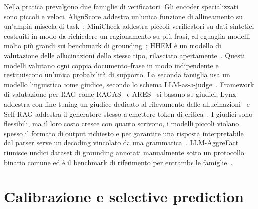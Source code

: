 Nella pratica prevalgono due famiglie di verificatori. Gli encoder specializzati sono piccoli e veloci. AlignScore addestra
un'unica funzione di allineamento su un'ampia miscela di task~\cite{zha2023alignscore}; MiniCheck addestra piccoli
verificatori su dati sintetici costruiti in modo da richiedere un ragionamento su più frasi, ed eguaglia modelli molto più
grandi sui benchmark di grounding~\cite{tang2024minicheck}; HHEM è un modello di valutazione delle allucinazioni dello
stesso tipo, rilasciato apertamente~\cite{vectara2024hhem}. Questi modelli valutano ogni coppia documento--frase in modo
indipendente e restituiscono un'unica probabilità di supporto. La seconda famiglia usa un modello linguistico come
giudice, secondo lo schema LLM-as-a-judge~\cite{zheng2023judging}. Framework di valutazione per RAG come
RAGAS~\cite{es2024ragas} e ARES~\cite{saadfalcon2024ares} si basano su giudici, Lynx addestra con fine-tuning un giudice
dedicato al rilevamento delle allucinazioni~\cite{ravi2024lynx} e Self-RAG addestra il generatore stesso a emettere token
di critica~\cite{asai2024selfrag}. I giudici sono flessibili, ma il loro costo cresce con quanto scrivono, i modelli
piccoli violano spesso il formato di output richiesto e per garantire una risposta interpretabile dal parser serve un
decoding vincolato da una grammatica~\cite{willard2023outlines}. LLM-AggreFact riunisce undici dataset di grounding
annotati manualmente sotto un protocollo binario comune ed è il benchmark di riferimento per entrambe le
famiglie~\cite{tang2024minicheck,llmaggrefact}.

\section{Calibrazione e selective prediction}
\label{sec:bg-calibration}

